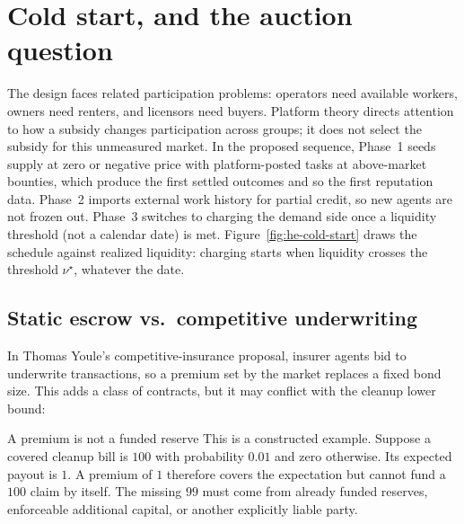 \documentclass[11pt,a4paper]{article}
\theoremstyle{definition}
\theoremstyle{definition}
\theoremstyle{remark}
\begin{document}
\section{Cold start, and the auction question}\label{sec:cold-start}

The design faces related participation problems: operators need available
workers, owners need renters, and licensors need buyers. Platform theory directs
attention to how a subsidy changes participation across groups; it does not
select the subsidy for this unmeasured market. In the proposed sequence,
Phase~1 seeds supply at
zero or negative price with platform-posted tasks at above-market bounties, which
produce the first settled outcomes and so the first reputation data. Phase~2 imports external
work history for partial credit, so new agents are not frozen out. Phase~3 switches to
charging the demand side once a liquidity threshold (not a calendar date) is met.
Figure~\ref{fig:he-cold-start} draws the schedule against realized liquidity:
charging starts when liquidity crosses the threshold $\nu^\star$, whatever
the date.



\subsection{Static escrow vs.\ competitive underwriting}\label{sec:fh-equilibria}\label{sec:youle:welfare}


%
In Thomas Youle's competitive-insurance proposal, insurer agents bid to
underwrite transactions, so a premium set by the market replaces a fixed bond
size. This adds a class of contracts, but it may conflict with the cleanup
lower bound:

\begin{pdexample}{A premium is not a funded reserve}
This is a constructed example. Suppose a covered cleanup bill is $100$ with probability
$0.01$ and zero otherwise. Its expected payout is $1$. A premium of $1$
therefore covers the expectation but cannot fund a $100$ claim by itself.
The missing $99$ must come from already funded reserves, enforceable additional
capital, or another explicitly liable party.
\end{pdexample}
\end{document}
